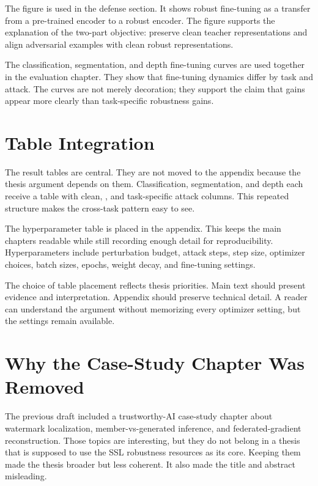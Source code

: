 The \DeACL figure is used in the defense section. It shows robust fine-tuning as a transfer from a pre-trained encoder to a robust encoder. The figure supports the explanation of the two-part objective: preserve clean teacher representations and align adversarial examples with clean robust representations.

The classification, segmentation, and depth fine-tuning curves are used together in the evaluation chapter. They show that \DeACL fine-tuning dynamics differ by task and attack. The curves are not merely decoration; they support the claim that \EmbedAttack gains appear more clearly than task-specific robustness gains.

\section{Table Integration}

The result tables are central. They are not moved to the appendix because the thesis argument depends on them. Classification, segmentation, and depth each receive a table with clean, \EmbedAttack, and task-specific attack columns. This repeated structure makes the cross-task pattern easy to see.

The hyperparameter table is placed in the appendix. This keeps the main chapters readable while still recording enough detail for reproducibility. Hyperparameters include perturbation budget, attack steps, step size, optimizer choices, batch sizes, epochs, weight decay, and \DeACL fine-tuning settings.

The choice of table placement reflects thesis priorities. Main text should present evidence and interpretation. Appendix should preserve technical detail. A reader can understand the argument without memorizing every optimizer setting, but the settings remain available.

\section{Why the Case-Study Chapter Was Removed}

The previous draft included a trustworthy-AI case-study chapter about watermark localization, member-vs-generated inference, and federated-gradient reconstruction. Those topics are interesting, but they do not belong in a thesis that is supposed to use the SSL robustness resources as its core. Keeping them made the thesis broader but less coherent. It also made the title and abstract misleading.

